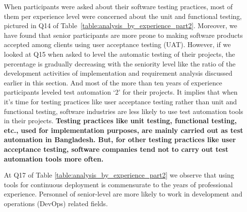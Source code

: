 When participants were asked about their software testing practices, most of them per experience level were concerned about the unit and functional testing, pictured in Q14 of Table~\ref{table:analysis_by_experience_part2}. Moreover, we have found that senior participants are more prone to making software products accepted among clients using user acceptance testing (UAT). However, if we looked at Q15 when asked to level the automatic testing of their projects, the percentage is gradually decreasing with the seniority level like the ratio of the development activities of implementation and requirement analysis discussed earlier in this section. And most of the more than ten years of experience participants leveled test automation `2' for their projects. It implies that when it's time for testing practices like user acceptance testing rather than unit and functional testing, software industries are less likely to use test automation tools in their projects.
\bf{Testing practices like unit testing, functional testing, etc., used for implementation purposes, are mainly carried out as test automation in Bangladesh. But, for other testing practices like user acceptance testing, software companies tend not to carry out test automation tools more often.}

At Q17 of Table \ref{table:analysis_by_experience_part2} we observe that using tools for continuous deployment is commensurate to the years of professional experience. Personnel of senior-level are more likely to work in development and operations (DevOps) related fields.